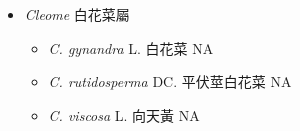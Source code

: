 
  \begin{itemize}
 \item[] \textit{Cleome} 白花菜屬
                                
  \begin{itemize}
        \item[] \textit{C. gynandra} L.  白花菜   NA
        \item[] \textit{C. rutidosperma} DC.  平伏莖白花菜   NA
        \item[] \textit{C. viscosa} L.  向天黃   NA
  \end{itemize}
  \end{itemize}
